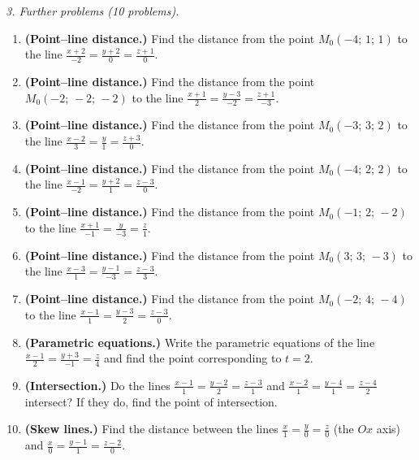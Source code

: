 \emph{3. Further problems (10 problems).}
\bigskip
\begin{enumerate}[label=\arabic*., leftmargin=*]
\item \textbf{(Point–line distance.)} Find the distance from the point $M_0(-4;\,1;\,1)$ to the line $\frac{x+2}{-2}=\frac{y+2}{0}=\frac{z+1}{0}$.
\item \textbf{(Point–line distance.)} Find the distance from the point $M_0(-2;\,-2;\,-2)$ to the line $\frac{x+1}{2}=\frac{y-3}{-2}=\frac{z+1}{-3}$.
\item \textbf{(Point–line distance.)} Find the distance from the point $M_0(-3;\,3;\,2)$ to the line $\frac{x-2}{3}=\frac{y}{1}=\frac{z+3}{0}$.
\item \textbf{(Point–line distance.)} Find the distance from the point $M_0(-4;\,2;\,2)$ to the line $\frac{x-1}{-2}=\frac{y+2}{1}=\frac{z-3}{0}$.
\item \textbf{(Point–line distance.)} Find the distance from the point $M_0(-1;\,2;\,-2)$ to the line $\frac{x+1}{-1}=\frac{y}{-3}=\frac{z}{1}$.
\item \textbf{(Point–line distance.)} Find the distance from the point $M_0(3;\,3;\,-3)$ to the line $\frac{x-3}{1}=\frac{y-1}{-3}=\frac{z-3}{3}$.
\item \textbf{(Point–line distance.)} Find the distance from the point $M_0(-2;\,4;\,-4)$ to the line $\frac{x-1}{1}=\frac{y-3}{2}=\frac{z-3}{0}$.
\item \textbf{(Parametric equations.)} Write the parametric equations of the line $\frac{x-1}{2}=\frac{y+3}{-1}=\frac{z}{4}$ and find the point corresponding to $t=2$.
\item \textbf{(Intersection.)} Do the lines $\frac{x-1}{1}=\frac{y-2}{2}=\frac{z-3}{1}$ and $\frac{x-2}{1}=\frac{y-4}{1}=\frac{z-4}{2}$ intersect? If they do, find the point of intersection.
\item \textbf{(Skew lines.)} Find the distance between the lines $\frac{x}{1}=\frac{y}{0}=\frac{z}{0}$ (the $Ox$ axis) and $\frac{x}{0}=\frac{y-1}{1}=\frac{z-2}{0}$.
\end{enumerate}

